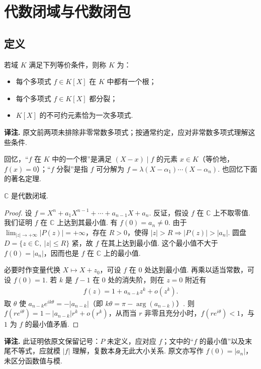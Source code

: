 \section{代数闭域与代数闭包}\label{sec:galois-2-2}
\subsection{定义}\label{sec:galois-2-2-1}
\begin{definition*}
若域 $K$ 满足下列等价条件，则称 $K$ 为：
\begin{itemize}
\item 每个多项式 $f\in K[X]$ 在 $K$ 中都有一个根；
\item 每个多项式 $f\in K[X]$ 都分裂；
\item $K[X]$ 的不可约元素恰为一次多项式.
\end{itemize}
\end{definition*}
\noindent\textbf{译注.} 原文前两项未排除非零常数多项式；按通常约定，应对非常数多项式理解这些条件.

回忆，``$f$ 在 $K$ 中的一个根''是满足 $(X-x)\mid f$ 的元素 $x\in K$（等价地，$f(x)=0$）；``$f$ 分裂''是指 $f$ 可分解为 $f=\lambda(X-\alpha_1)\cdots(X-\alpha_n)$. 也回忆下面的著名定理.
\begin{theorem*}
$\mathbb C$ 是代数闭域.
\end{theorem*}
\begin{proof}
设 $f=X^n+a_1X^{n-1}+\cdots+a_{n-1}X+a_n$. 反证，假设 $f$ 在 $\mathbb C$ 上不取零值. 我们证明 $f$ 在 $\mathbb C$ 上达到其最小值. 有 $f(0)=a_n\ne0$. 由于 $\lim_{|z|\to+\infty}|P(z)|=+\infty$，存在 $R>0$，使得 $|z|>R\Rightarrow |P(z)|>|a_n|$. 圆盘 $D=\{z\in\mathbb C,\ |z|\le R\}$ 紧，故 $f$ 在其上达到最小值. 这个最小值不大于 $f(0)=|a_n|$，因而也是 $f$ 在 $\mathbb C$ 上的最小值.

必要时作变量代换 $X\mapsto X+z_0$，可设 $f$ 在 $0$ 处达到最小值. 再乘以适当常数，可设 $f(0)=1$. 若 $k$ 是 $f-1$ 在 $0$ 处的消失阶，则在 $z=0$ 附近有
\begin{align*}
f(z)=1+a_{n-k}z^k+o(z^k).
\end{align*}
取 $\theta$ 使 $a_{n-k}e^{ik\theta}=-|a_{n-k}|$（即 $k\theta=\pi-\arg(a_{n-k})$）. 则 $f(re^{i\theta})=1-|a_{n-k}|r^k+o(r^k)$，从而当 $r$ 非零且充分小时，$f(re^{i\theta})<1$，与 $1$ 为 $f$ 的最小值矛盾.
\end{proof}
\noindent\textbf{译注.} 此证明依原文保留记号：$P$ 未定义，应对应 $f$；文中的``$f$ 的最小值''以及末尾不等式，应就模 $|f|$ 理解，复数本身无此大小关系. 原文亦写作 $f(0)=|a_n|$，未区分函数值与模.

